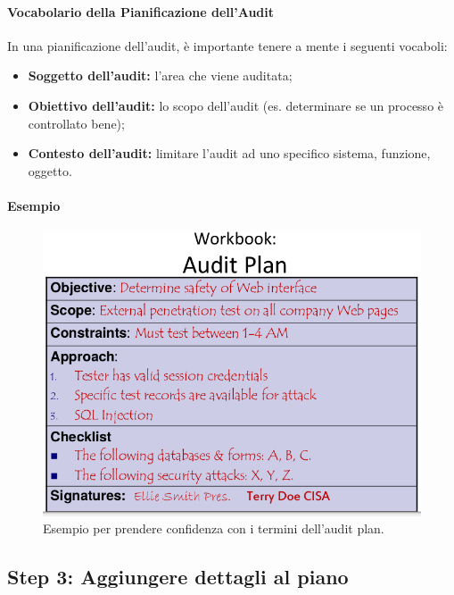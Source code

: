 \paragraph{Vocabolario della Pianificazione dell'Audit}

In una pianificazione dell'audit, è importante tenere a mente i seguenti 
vocaboli:
\begin{itemize}
\item \textbf{Soggetto dell'audit:} l'area che viene auditata;
\item \textbf{Obiettivo dell'audit:} lo scopo dell'audit (es. determinare se un processo 
è controllato bene);
\item \textbf{Contesto dell'audit:} limitare l'audit ad uno specifico sistema, funzione, 
oggetto.
\end{itemize}


\paragraph*{Esempio}

\begin{figure}[H]
	\begin{center}	
\includegraphics[scale=0.3]{res/img/audit_plan_vocabulary_example.png}
	\end{center}
	\caption{Esempio per prendere confidenza con i termini dell'audit plan.}
	\label{fig:audit:plan:vocabulary:example}
\end{figure}

\subsection{Step 3: Aggiungere dettagli al piano}

